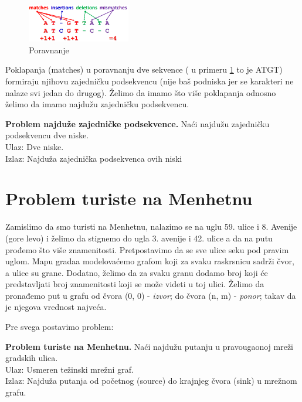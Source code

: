 \begin{figure}[H]
\centering
\includegraphics[width=0.4\textwidth]{poglavlja/5/slike/poravnanje.png}
\caption{Poravnanje}
\label{slika:poravnavanje}
\end{figure} 

Poklapanja (matches) u poravnanju dve sekvence ( u primeru \ref{slika:poravnavanje} to je ATGT) formiraju njihovu zajedničku podsekvencu (nije baš podniska jer se karakteri ne nalaze svi jedan do drugog). Želimo da imamo što više poklapanja odnosno želimo da imamo najdužu zajedničku podsekvencu.

\begin{tcolorbox}\textbf{Problem najduže zajedničke podsekvence.}
	Naći najdužu zajedničku podsekvencu dve niske. \\
	Ulaz: Dve niske. \\
	Izlaz: Najduža zajednička podsekvenca ovih niski
\end{tcolorbox}

\section{Problem turiste na Menhetnu}

Zamislimo da smo turisti na Menhetnu, nalazimo se na uglu 59. ulice i 8. Avenije (gore levo) i želimo da stignemo do ugla 3. avenije i 42. ulice a da na putu prođemo što više znamenitosti. Pretpostavimo da se sve ulice seku pod pravim uglom. Mapu gradaa modelovaćemo grafom koji za svaku raskrsnicu sadrži čvor, a ulice su grane. Dodatno, želimo da za svaku granu dodamo broj koji će predstavljati broj znamenitosti koji se može videti u toj ulici. Želimo da pronađemo put u grafu od čvora (0, 0) - \textit{izvor}; do čvora (n, m) - \textit{ponor}; takav da je njegova vrednost najveća.

\noindent Pre svega postavimo problem:

\begin{tcolorbox}\textbf{Problem turiste na Menhetnu.}
	Naći najdužu putanju u pravougaonoj mreži gradskih ulica. \\
	Ulaz: Usmeren težinski mrežni graf. \\
	Izlaz: Najduža putanja od početnog (source) do krajnjeg čvora (sink) u mrežnom grafu. 
\end{tcolorbox}

